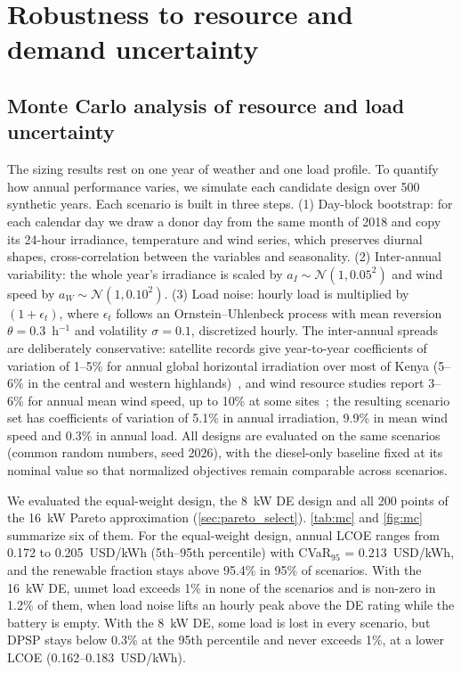 \documentclass[final,3p,times]{elsarticle}
\begin{document}
\section{Robustness to resource and demand uncertainty}

\subsection{Monte Carlo analysis of resource and load uncertainty\label{sec:mc}}
The sizing results rest on one year of weather and one load profile. To quantify how annual performance varies, we simulate each candidate design over 500 synthetic years. Each scenario is built in three steps. (1) Day-block bootstrap: for each calendar day we draw a donor day from the same month of 2018 and copy its 24-hour irradiance, temperature and wind series, which preserves diurnal shapes, cross-correlation between the variables and seasonality. (2) Inter-annual variability: the whole year's irradiance is scaled by $a_I \sim \mathcal{N}(1, 0.05^2)$ and wind speed by $a_W \sim \mathcal{N}(1, 0.10^2)$. (3) Load noise: hourly load is multiplied by $(1 + \epsilon_t)$, where $\epsilon_t$ follows an Ornstein--Uhlenbeck process with mean reversion $\theta = 0.3$~h$^{-1}$ and volatility $\sigma = 0.1$, discretized hourly. The inter-annual spreads are deliberately conservative: satellite records give year-to-year coefficients of variation of 1--5\% for annual global horizontal irradiation over most of Kenya (5--6\% in the central and western highlands)~\cite{kariuki2018solar}, and wind resource studies report 3--6\% for annual mean wind speed, up to 10\% at some sites~\cite{lee2018wes}; the resulting scenario set has coefficients of variation of 5.1\% in annual irradiation, 9.9\% in mean wind speed and 0.3\% in annual load. All designs are evaluated on the same scenarios (common random numbers, seed 2026), with the diesel-only baseline fixed at its nominal value so that normalized objectives remain comparable across scenarios.

We evaluated the equal-weight design, the 8~kW DE design and all 200 points of the 16~kW Pareto approximation (\cref{sec:pareto_select}). \cref{tab:mc} and \cref{fig:mc} summarize six of them. For the equal-weight design, annual LCOE ranges from 0.172 to 0.205~USD/kWh (5th--95th percentile) with CVaR$_{95}$ = 0.213~USD/kWh, and the renewable fraction stays above 95.4\% in 95\% of scenarios. With the 16~kW DE, unmet load exceeds 1\% in none of the scenarios and is non-zero in 1.2\% of them, when load noise lifts an hourly peak above the DE rating while the battery is empty. With the 8~kW DE, some load is lost in every scenario, but DPSP stays below 0.3\% at the 95th percentile and never exceeds 1\%, at a lower LCOE (0.162--0.183~USD/kWh).
\end{document}
